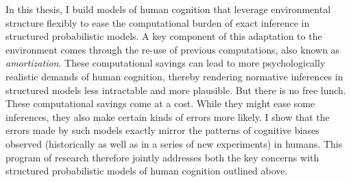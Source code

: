 In this thesis, I build models of human cognition that leverage environmental structure flexibly to ease the computational burden of exact inference in structured probabilistic models. A key component of this adaptation to the environment comes through the re-use of previous computations, also known as \textit{amortization}. These computational savings can lead to more psychologically realistic demands of human cognition, thereby rendering normative inferences in structured models less intractable and more plausible. But there is no free lunch. These computational savings come at a cost. While they might ease some inferences, they also make certain kinds of errors more likely. I show that the errors made by such models exactly mirror the patterns of cognitive biases observed (historically as well as in a series of new experiments) in humans. This program of research therefore jointly addresses both the key concerns with structured probabilistic models of human cognition outlined above.


